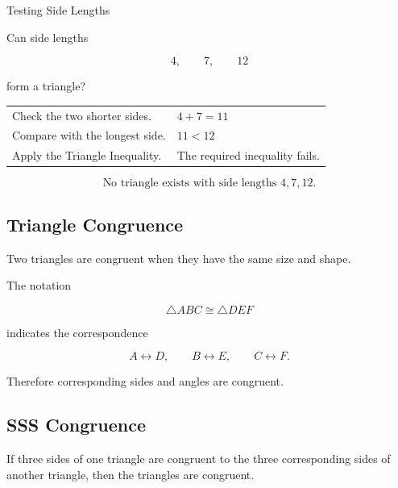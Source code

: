 \begin{workedexamplebox}{Testing Side Lengths}

Can side lengths

\[ 4,\qquad7,\qquad12 \]

form a triangle?

\begin{tabularx}{\textwidth}{@{}>{\raggedright\arraybackslash}p{}X@{}}
Check the two shorter sides. & \(4+7=11\)\\
Compare with the longest side. & \(11<12\)\\
Apply the Triangle Inequality. & The required inequality fails.
\end{tabularx}

\begin{answerbox}
\[ \boxed{\text{No triangle exists with side lengths }4,7,12.} \]
\end{answerbox}
\end{workedexamplebox}

\subsection{Triangle Congruence}
\label{subsec:triangle-congruence}

Two triangles are congruent when they have the same size and shape.

The notation

\[ \triangle ABC\cong\triangle DEF \]

indicates the correspondence

\[ A\leftrightarrow D,\qquad B\leftrightarrow E,\qquad C\leftrightarrow F. \]

Therefore corresponding sides and angles are congruent.

\subsection{SSS Congruence}
\label{subsec:sss-congruence}

\begin{theorem}
If three sides of one triangle are congruent to the three corresponding
sides of another triangle, then the triangles are congruent.
\end{theorem}


